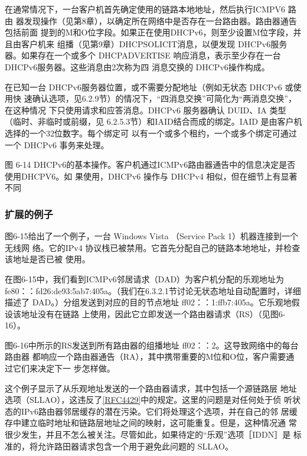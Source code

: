 在通常情况下，一台客户机首先确定使用的链路本地地址，然后执行ICMPV6 路由
器发现操作（见第8章），以确定所在网络中是否存在一台路由器。路由器通告包括前面
提到的M和O位字段。如果正在使用DHCPv6，则至少设置M位字段，并且由客户机来
组播（见第9章）DHCPSOLICIT消息，以便发现 DHCPv6服务器。如果存在一个或多个
DHCPADVERTISE 响应消息，表示至少存在一台 DHCPv6服务器。这些消息由2次称为四
消息交换的 DHCPv6操作构成。

在已知一台 DHCPv6服务器位置，或不需要分配地址（例如无状态 DHCPv6 或使用快
速确认选项，见6.2.9节）的情况下，“四消息交换”可简化为“两消息交换”，在这种情况
下只使用请求和应答消息。DHCPv6 服务器确认 DUID、IA 类型（临时、非临时或前缀，见
6.2.5.3节）和IAID结合而成的绑定。IAID 是由客户机选择的一个32位数字。每个绑定可
以有一个或多个租约，一个或多个绑定可通过一个 DHCPv6 事务来处理。

图 6-14
DHCPv6的基本操作。客户机通过ICMPv6路由器通告中的信息决定是否使用DHCPV6。如
果使用，DHCPv6 操作与 DHCPv4 相似，但在细节上有显著不同

\subsubsection{扩展的例子}

图6-15给出了一个例子，一台 Windows Vista （Service Pack 1）机器连接到一个无线网
络。它的IPv4 协议栈已被禁用。它首先分配自己的链路本地地址，并检查该地址是否已被
使用。

在图6-15中，我们看到ICMPv6邻居请求（DAD）为客户机分配的乐观地址为
fe80：：fd26:de93:5ab7:405a。（我们在6.3.2.1节讨论无状态地址自动配置时，详细描述了
DAD。）分组发送到对应的目的节点地址 ff02：：1:ffb7:405a。它乐观地假设该地址没有在链路
上使用，因此它立即发送一个路由器请求（RS）（见图6-16）。

图6-16中所示的RS发送到所有路由器的组播地址 ff02：：2。这导致网络中的每台路由器
都响应一个路由器通告（RA），其中携带重要的M位和O位，客户需要通过它们来决定下一
步怎样做。

\begin{tcolorbox}
  这个例子显示了从乐观地址发送的一个路由器请求，其中包括一个源链路层
  地址选项（SLLAO），这违反了\href{https://www.rfc-editor.org/rfc/rfc4429}{\href{https://www.rfc-editor.org/rfc/rfc4429}{[RFC4429]}}中的规定。这里的问题是对任何处于侦
  听状态的IPv6路由器邻居缓存的潜在污染。它们将处理这个选项，并在自己的邻
  居缓存中建立临时地址和链路层地址之间的映射，这可能重复。但是，这种情况通
  常很少发生，并且不怎么被关注。尽管如此，如果待定的“乐观”选项［IDDN］是
  标准的，将允许路田器请求包含一个用于避免此问题的 SLLAO。
\end{tcolorbox}

